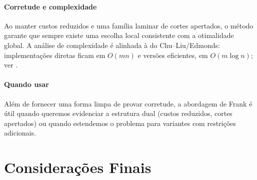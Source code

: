 \documentclass[12pt,a4paper]{article}
\begin{document}
\paragraph{Corretude e complexidade}
Ao manter custos reduzidos e uma família laminar de cortes apertados, o método garante que sempre existe uma escolha local consistente com a otimalidade global. A análise de complexidade é alinhada à do Chu–Liu/Edmonds: implementações diretas ficam em \(O(mn)\) e versões eficientes, em \(O(m\log n)\); ver \cite{frank2014,schrijver2003comb}.

\paragraph{Quando usar}
Além de fornecer uma forma limpa de provar corretude, a abordagem de Frank é útil quando queremos evidenciar a estrutura dual (custos reduzidos, cortes apertados) ou quando estendemos o problema para variantes com restrições adicionais.
    
\section{Considerações Finais}
\printbibliography
\end{document}
